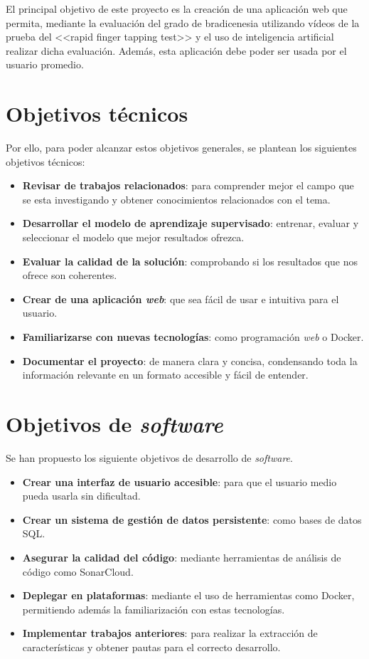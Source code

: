 
El principal objetivo de este proyecto es la creación de una aplicación web que permita, mediante la evaluación del grado de bradicenesia utilizando vídeos de la prueba del <<rapid finger tapping test>> y el uso de inteligencia artificial realizar dicha evaluación. Además, esta aplicación debe poder ser usada por el usuario promedio.


\section{Objetivos técnicos}

Por ello, para poder alcanzar estos objetivos generales, se plantean los siguientes objetivos técnicos:
\begin{itemize}
\item \textbf{Revisar de trabajos relacionados}: para comprender mejor el campo que se esta investigando y obtener conocimientos relacionados con el tema.
\item \textbf{Desarrollar el modelo de aprendizaje supervisado}: entrenar, evaluar y seleccionar el modelo que mejor resultados ofrezca.
\item \textbf{Evaluar la calidad de la solución}: comprobando si los resultados que nos ofrece son coherentes.
\item \textbf{Crear de una aplicación \textit{web}}: que sea fácil de usar e intuitiva para el usuario.
\item \textbf{Familiarizarse con nuevas tecnologías}: como programación \textit{web} o Docker.
\item \textbf{Documentar el proyecto}: de manera clara y concisa, condensando toda la información relevante en un formato accesible y fácil de entender.
\end{itemize}

\section{Objetivos de \textit{software}}

Se han propuesto los siguiente objetivos de desarrollo de \textit{software}.
\begin{itemize}
\item \textbf{Crear una interfaz de usuario accesible}: para que el usuario medio pueda usarla sin dificultad.
\item \textbf{Crear un sistema de gestión de datos persistente}: como bases de datos SQL.
\item \textbf{Asegurar la calidad del código}: mediante herramientas de análisis de código como SonarCloud.
\item \textbf{Deplegar en plataformas}: mediante el uso de herramientas como Docker, permitiendo además la familiarización con estas tecnologías.
\item \textbf{Implementar trabajos anteriores}: para realizar la extracción de características y obtener pautas para el correcto desarrollo.
\end{itemize}